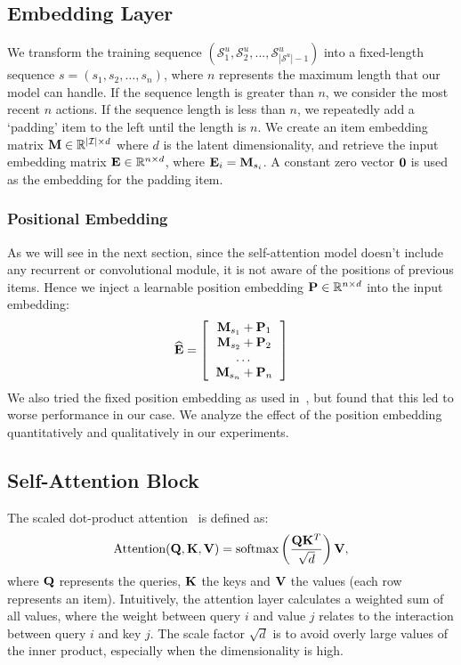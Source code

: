\documentclass[conference]{IEEEtran}
\def\E{{\bf E}}
\def\K{{\bf K}}
\def\M{{\bf M}}
\def\P{{\bf P}}
\def\Q{{\bf Q}}
\def\V{{\bf V}}
\def\0{{\bf 0}}
\newcommand{\xhdr}[1]{\subsubsection*{\bf #1}}
\begin{document}
\subsection{Embedding Layer}

We transform the training sequence $(\mathcal{S}^u_1, \mathcal{S}^u_2, ... , \mathcal{S}^u_{|\mathcal{S}^u|-1})$ into a fixed-length sequence $s=(s_1,s_2,\dots,s_n)$, where $n$ represents the maximum length that our model can handle. If the sequence length is greater than $n$, we 
consider
the most recent $n$ actions. If the sequence length is less than $n$, we 
repeatedly
add a `padding' item to the left until the length is $n$. We create an item embedding matrix $\M\in\mathbb{R}^{|\mathcal{I}|\times d}$ where $d$ is the latent dimensionality, and retrieve the input embedding matrix $\E\in\mathbb{R}^{n\times d}$, where $\E_i=\M_{s_i}$.
A constant zero vector $\0$ is used as the embedding for the padding item.

\xhdr{Positional Embedding}
As we will see in the next section, since the self-attention model doesn't include any recurrent or convolutional module, it is not aware of the positions of previous items. Hence we inject a learnable position embedding $\P\in\mathbb{R}^{n\times d}$ into the input embedding:
\begin{equation}
\widehat{\E}=\left [
  \begin{tabular}{c}
  $\M_{s_1}+\P_{1}$ \\
  $\M_{s_2}+\P_{2}$ \\
  $\dots$ \\
  $\M_{s_n}+\P_{n}$
  \end{tabular}
\right ]
\end{equation}
We also tried the fixed position embedding as used in~\cite{transform}, 
but found that this led to worse performance in our case.
We analyze the effect of the position embedding quantitatively and qualitatively in our experiments. 


\subsection{Self-Attention Block}

The scaled dot-product attention~\cite{transform} is defined as:
\begin{equation}
\text{Attention}(\Q,\K,\V)=\text{softmax}\left (\frac{\Q\K^T}{\sqrt{d}}\right )\V,
\end{equation}
where $\Q$ represents the queries, $\K$ 
the keys and $\V$ 
the values (each row represents an item). Intuitively, the attention layer calculates a weighted sum of all values, where the weight between query $i$ and value $j$ relates to
the interaction between query $i$ and key $j$. The scale factor $\sqrt{d}$ is to avoid 
overly large
values of the inner product, especially when the dimensionality is high.
\end{document}
